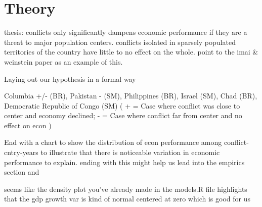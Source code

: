 \section{Theory}
\label{theory}

thesis: conflicts only significantly dampens economic performance if they are a threat to major population centers. conflicts isolated in sparsely populated territories of the country have little to no effect on the whole. point to the imai & weinstein paper as an example of this. 

Laying out our hypothesis in a formal way

	Columbia +/- (BR), Pakistan - (SM), Philippines (BR), Israel (SM), Chad (BR), Democratic Republic of Congo (SM)
	(  + = Case where conflict was close to center and economy declined; - = Case where conflict far from center and no effect on econ )

End with a chart to show the distribution of econ performance among conflict-cntry-years to illustrate that there is noticeable variation in economic performance to explain. ending with this might help us lead into the empirics section and 

	seems like the density plot you've already made in the models.R file highlights that the gdp growth var is kind of normal centered at zero which is good for us	
